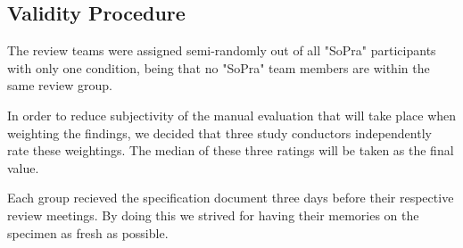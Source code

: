 \subsection{Validity Procedure}

The review teams were assigned semi-randomly out of all "SoPra" participants with only one condition, being that no "SoPra" team members are within the same review group.

In order to reduce subjectivity of the manual evaluation that will take place when weighting the findings, we decided that three study conductors independently rate these weightings. The median of these three ratings will be taken as the final value.

Each group recieved the specification document three days before their respective review meetings. By doing this we strived for having their memories on the specimen as fresh as possible.

